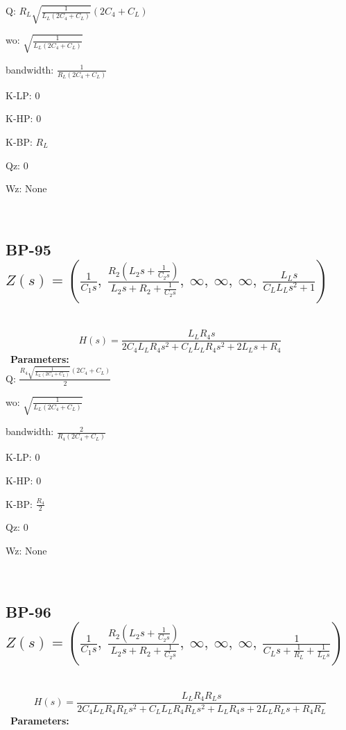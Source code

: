 \documentclass{article}
\begin{document}
Q: $R_{L} \sqrt{\frac{1}{L_{L} \left(2 C_{4} + C_{L}\right)}} \left(2 C_{4} + C_{L}\right)$\ 

wo: $\sqrt{\frac{1}{L_{L} \left(2 C_{4} + C_{L}\right)}}$\ 

bandwidth: $\frac{1}{R_{L} \left(2 C_{4} + C_{L}\right)}$\ 

K-LP: $0$\ 

K-HP: $0$\ 

K-BP: $R_{L}$\ 

Qz: $0$\ 

Wz: $\text{None}$\ 

\ 

\subsection{BP-95 $Z(s) = \left( \frac{1}{C_{1} s}, \  \frac{R_{2} \left(L_{2} s + \frac{1}{C_{2} s}\right)}{L_{2} s + R_{2} + \frac{1}{C_{2} s}}, \  \infty, \  \infty, \  \infty, \  \frac{L_{L} s}{C_{L} L_{L} s^{2} + 1}\right)$ } \ 
\textbf{\[H(s) = \frac{L_{L} R_{4} s}{2 C_{4} L_{L} R_{4} s^{2} + C_{L} L_{L} R_{4} s^{2} + 2 L_{L} s + R_{4}}\] } \ 
\textbf{Parameters:}\\ 

Q: $\frac{R_{4} \sqrt{\frac{1}{L_{L} \left(2 C_{4} + C_{L}\right)}} \left(2 C_{4} + C_{L}\right)}{2}$\ 

wo: $\sqrt{\frac{1}{L_{L} \left(2 C_{4} + C_{L}\right)}}$\ 

bandwidth: $\frac{2}{R_{4} \left(2 C_{4} + C_{L}\right)}$\ 

K-LP: $0$\ 

K-HP: $0$\ 

K-BP: $\frac{R_{4}}{2}$\ 

Qz: $0$\ 

Wz: $\text{None}$\ 

\ 

\subsection{BP-96 $Z(s) = \left( \frac{1}{C_{1} s}, \  \frac{R_{2} \left(L_{2} s + \frac{1}{C_{2} s}\right)}{L_{2} s + R_{2} + \frac{1}{C_{2} s}}, \  \infty, \  \infty, \  \infty, \  \frac{1}{C_{L} s + \frac{1}{R_{L}} + \frac{1}{L_{L} s}}\right)$ } \ 
\textbf{\[H(s) = \frac{L_{L} R_{4} R_{L} s}{2 C_{4} L_{L} R_{4} R_{L} s^{2} + C_{L} L_{L} R_{4} R_{L} s^{2} + L_{L} R_{4} s + 2 L_{L} R_{L} s + R_{4} R_{L}}\] } \ 
\textbf{Parameters:}\\ 
\end{document}
